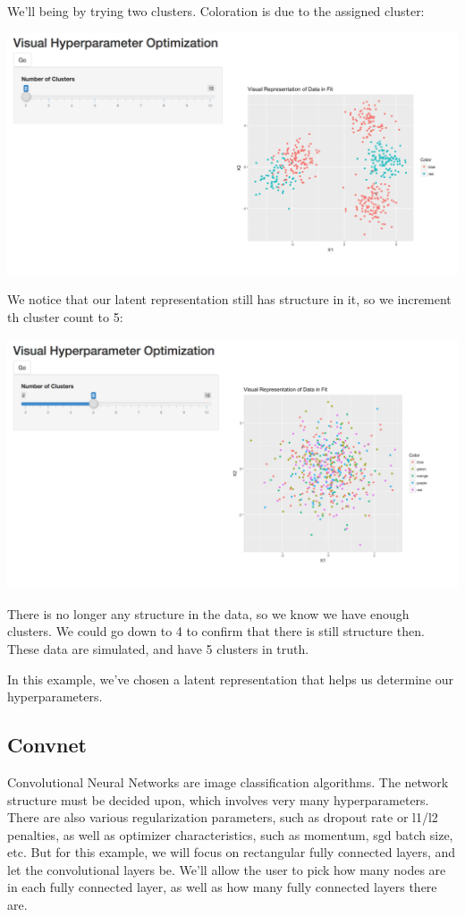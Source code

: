 \documentclass[a4paper]{article}
\begin{document}
We'll being by trying two clusters. Coloration is due to the assigned cluster:

\includegraphics[width=\linewidth]{../images/norm_mix_1.png}

We notice that our latent representation still has structure in it, so we increment th cluster count to 5:

\includegraphics[width=\linewidth]{../images/norm_mix_2.png}

There is no longer any structure in the data, so we know we have enough clusters. We could go down to 4 to confirm that there is still structure then. These data are simulated, and have 5 clusters in truth.

In this example, we've chosen a latent representation that helps us determine our hyperparameters.

\subsection{Convnet}

Convolutional Neural Networks are image classification algorithms. The network structure must be decided upon, which involves very many hyperparameters. There are also various regularization parameters, such as dropout rate or l1/l2 penalties, as well as optimizer characteristics, such as momentum, sgd batch size, etc. But for this example, we will focus on rectangular fully connected layers, and let the convolutional layers be. We'll allow the user to pick how many nodes are in each fully connected layer, as well as how many fully connected layers there are. 
\end{document}
